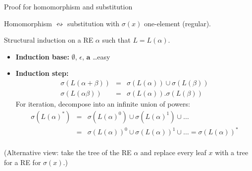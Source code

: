 \documentclass[handout]{beamer}
\begin{document}
        
\begin{frame}{Proof for homomorphism and substitution}

    Homomorphism $\leftrightsquigarrow$ substitution with $\sigma(x)$ one-element (regular).

    Structural induction on a RE $\alpha$ such that $L=L(\alpha)$. 
    
    \begin{itemize}
        \item \textbf{Induction base:} $\emptyset$, $\epsilon$, $\mathbf{a}$ 
        \dots easy
        \item \textbf{Induction step:}
        \begin{eqnarray*}
            \sigma(L(\alpha+\beta))&=&\sigma(L(\alpha))\cup \sigma(L(\beta))\\
            \sigma(L(\alpha \beta))&=&\sigma(L(\alpha)).\sigma(L(\beta))
        \end{eqnarray*}        
        For iteration, decompose into an infinite union of powers:
        \begin{eqnarray*}
            \sigma(L(\alpha)^*)&=&\sigma(L(\alpha)^0)\cup \sigma(L(\alpha)^1)\cup \ldots\\
            &=&\sigma(L(\alpha))^0\cup \sigma(L(\alpha))^1\cup \ldots=\sigma(L(\alpha))^*\\
            &
        \end{eqnarray*}
        
    \end{itemize}

    (Alternative view: take the tree of the RE $\alpha$ and replace every leaf $x$ with a tree for a RE for $\sigma(x)$.)\hfill\qedsymbol

\end{frame}
\end{document}
